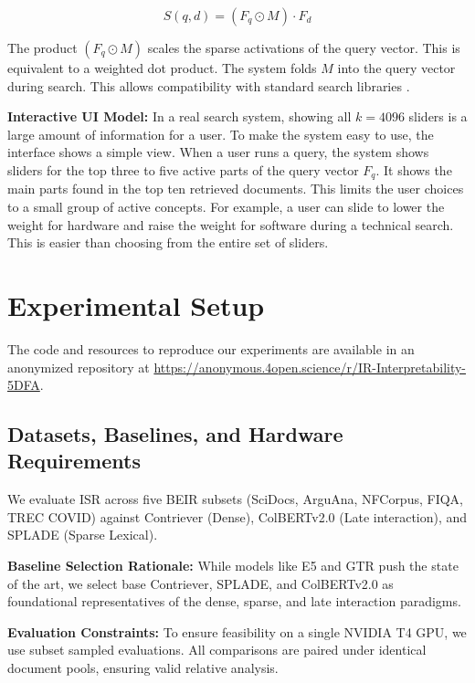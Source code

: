 \documentclass[sigconf,anonymous,screen]{acmart}
\begin{document}
\begin{equation}
S(q,d) = (F_q \odot M) \cdot F_d
\end{equation}

The product $(F_q \odot M)$ scales the sparse activations of the query vector. This is equivalent to a weighted dot product. The system folds $M$ into the query vector during search. This allows compatibility with standard search libraries \cite{johnson2019faiss}.

\textbf{Interactive UI Model:} In a real search system, showing all $k=4096$ sliders is a large amount of information for a user. To make the system easy to use, the interface shows a simple view. When a user runs a query, the system shows sliders for the top three to five active parts of the query vector $F_q$. It shows the main parts found in the top ten retrieved documents. This limits the user choices to a small group of active concepts. For example, a user can slide to lower the weight for hardware and raise the weight for software during a technical search. This is easier than choosing from the entire set of sliders.

\section{Experimental Setup}
The code and resources to reproduce our experiments are available in an anonymized repository at \url{https://anonymous.4open.science/r/IR-Interpretability-5DFA}.

\subsection{Datasets, Baselines, and Hardware Requirements}
\vspace{-2pt}
We evaluate ISR across five BEIR subsets \cite{thakur2021beir} (SciDocs, ArguAna, NFCorpus, FIQA, TREC COVID) against Contriever (Dense), ColBERTv2.0 \cite{santhanam2022colbertv2} (Late interaction), and SPLADE \cite{formal2021splade} (Sparse Lexical).

\textbf{Baseline Selection Rationale:} While models like E5 \cite{wang2024improving} and GTR \cite{ni2022large} push the state of the art, we select base Contriever, SPLADE, and ColBERTv2.0 as foundational representatives of the dense, sparse, and late interaction paradigms.

\textbf{Evaluation Constraints:} To ensure feasibility on a single NVIDIA T4 GPU, we use subset sampled evaluations. All comparisons are paired under identical document pools, ensuring valid relative analysis.
\end{document}
